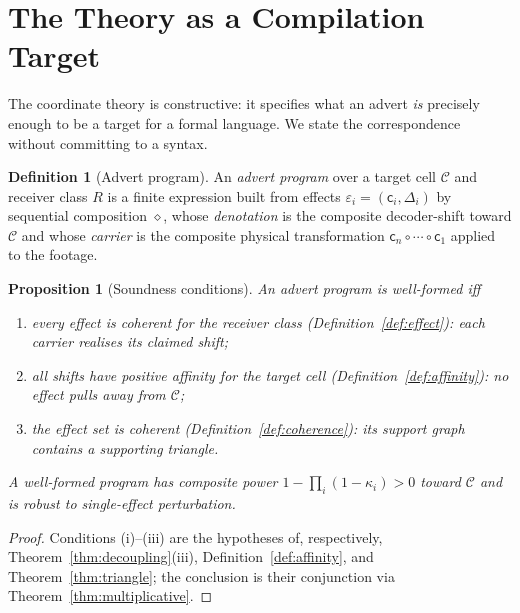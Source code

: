 \documentclass[twocolumn,11pt,a4paper]{article}
\theoremstyle{adv}
\newtheorem{proposition}[theorem]{Proposition}
\theoremstyle{definition}
\newtheorem{definition}[theorem]{Definition}
\theoremstyle{remark}
\newcommand{\Cell}{\mathcal{C}}        %
\newcommand{\Recv}{R}                  %
\newcommand{\Eff}{\varepsilon}        %
\newcommand{\Carrier}{\kappa}         %
\renewcommand{\Carrier}{\mathsf{c}}
\newcommand{\shift}{\Delta}            %
\newcommand{\pot}{\kappa}             %
\begin{document}
\section{The Theory as a Compilation Target}
\label{sec:compilation}

The coordinate theory is constructive: it specifies what an advert
\emph{is} precisely enough to be a target for a formal language. We state
the correspondence without committing to a syntax.

\begin{definition}[Advert program]
\label{def:program}
An \emph{advert program} over a target cell $\Cell$ and receiver class
$\Recv$ is a finite expression built from effects
$\Eff_i=(\Carrier_i,\shift_i)$ by sequential composition $\diamond$, whose
\emph{denotation} is the composite decoder-shift toward $\Cell$ and whose
\emph{carrier} is the composite physical transformation
$\Carrier_n\circ\cdots\circ\Carrier_1$ applied to the footage.
\end{definition}

\begin{proposition}[Soundness conditions]
\label{prop:soundness}
An advert program is \emph{well-formed} iff
\begin{enumerate}[label=(\roman*),leftmargin=1.8em,itemsep=1pt]
\item every effect is coherent for the receiver class
  (Definition~\ref{def:effect}): each carrier realises its claimed shift;
\item all shifts have positive affinity for the target cell
  (Definition~\ref{def:affinity}): no effect pulls away from $\Cell$;
\item the effect set is coherent (Definition~\ref{def:coherence}): its
  support graph contains a supporting triangle.
\end{enumerate}
A well-formed program has composite power $1-\prod_i(1-\pot_i)>0$ toward
$\Cell$ and is robust to single-effect perturbation.
\end{proposition}

\begin{proof}
Conditions (i)--(iii) are the hypotheses of, respectively,
Theorem~\ref{thm:decoupling}(iii), Definition~\ref{def:affinity}, and
Theorem~\ref{thm:triangle}; the conclusion is their conjunction via
Theorem~\ref{thm:multiplicative}.
\end{proof}
\end{document}
